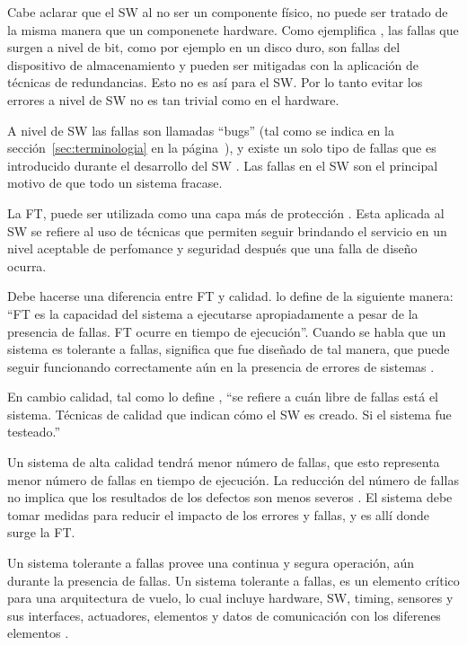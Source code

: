Cabe aclarar que el \ac{SW} al no ser un componente físico, no puede ser tratado de la misma 
manera que un componenete hardware. Como ejemplifica \cite{SoftwareFaultToleranceATutorial}, las 
fallas que surgen a nivel de bit, como por ejemplo en un disco duro, son fallas del dispositivo de 
almacenamiento y pueden ser mitigadas con la aplicación de técnicas de redundancias. Esto no es así 
para el \ac{SW}. Por lo tanto evitar los errores a nivel de \ac{SW} no es tan trivial como 
en el hardware.

A nivel de \ac{SW} las fallas son llamadas ``bugs'' (tal como se indica en la
sección~\ref{sec:terminologia} en la página~\pageref{sec:terminologia}), y existe 
un solo tipo de fallas que es introducido durante el desarrollo del \ac{SW} 
\citep{SoftwareFaultToleranceATutorial}. Las fallas en el \ac{SW} son el principal motivo de que 
todo un sistema fracase. 

La \ac{FT}, puede ser utilizada como una capa más de protección 
\citep{SoftwareFaultToleranceATutorial}. Esta aplicada al \ac{SW} se refiere al uso de técnicas que 
permiten seguir brindando el servicio en un nivel aceptable de perfomance y seguridad después que 
una falla de diseño ocurra. 

Debe hacerse una diferencia entre \ac{FT} y calidad. \cite{Hanmer07} lo define de la 
siguiente manera: ``\ac{FT} es la capacidad del sistema a ejecutarse apropiadamente a 
pesar de la presencia de fallas. \ac{FT} ocurre en tiempo de ejecución''. Cuando se 
habla que un sistema es tolerante a fallas, significa que fue diseñado de tal manera, que 
puede seguir funcionando correctamente aún en la presencia de errores de sistemas \citep{Hanmer07}. 

En cambio calidad, tal como lo define \cite{Hanmer07}, ``se refiere a cuán libre de fallas está el 
sistema. Técnicas de calidad que indican cómo el \ac{SW} es creado. Si el sistema fue testeado.'' 

Un sistema de alta calidad tendrá menor número de fallas, que esto representa menor número de 
fallas en tiempo de ejecución. La reducción del número de fallas no implica que los resultados de 
los defectos son menos severos \citep{Hanmer07}. El sistema debe tomar medidas para reducir el 
impacto de los errores y fallas, y es allí donde surge la \ac{FT}.	

Un sistema tolerante a fallas provee una continua y segura operación, aún durante la presencia 
de fallas. Un sistema tolerante a fallas, es un elemento crítico para una arquitectura de vuelo, lo 
cual incluye hardware, \ac{SW}, timing, sensores y sus interfaces, actuadores, elementos y datos 
de comunicación con los diferenes elementos \citep{FTAvionics}. 


